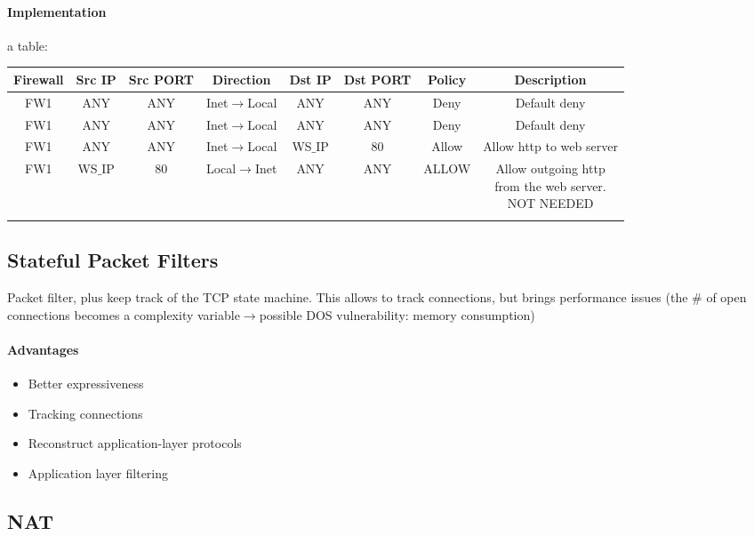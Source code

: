 \documentclass{article}
\begin{document}
\paragraph{Implementation} a table:\\
\begin{adjustwidth}{-3cm}{-3cm}
\begin{tabular}{|c|c|c|c|c|c|c|c|}
\hline
\textbf{Firewall}&\textbf{Src IP}&\textbf{Src PORT}&
\textbf{Direction}&\textbf{Dst IP}&
\textbf{Dst PORT}&\textbf{Policy}&
\textbf{Description}\\
\hline\hline
FW1		&ANY		&ANY		&Inet$\rightarrow$Local	&ANY		&ANY		&Deny	&Default deny\\
\hline
FW1		&ANY		&ANY		&Inet$\rightarrow$Local	&ANY		&ANY		&Deny	&Default deny\\
\hline
FW1		&ANY		&ANY		&Inet$\rightarrow$Local	&WS$\_$IP	&80		&Allow		&Allow http to web server\\
\hline
FW1		&WS$\_$IP	&80		&Local$\rightarrow$Inet	&ANY		&ANY		&ALLOW	&	\makecell{Allow outgoing http\\ from the web server.\\\color{red}NOT NEEDED}\\
\hline
&&&&&&&\\
\hline
\end{tabular}
\end{adjustwidth}

\subsection{Stateful Packet Filters}
Packet filter, plus keep track of the TCP state machine. This allows to track connections, but brings performance issues (the \# of open connections becomes a complexity variable$\rightarrow$possible DOS vulnerability: memory consumption)
\paragraph{Advantages}
\begin{itemize}
\item Better expressiveness
\item Tracking connections
\item Reconstruct application-layer protocols
\item Application layer filtering
\end{itemize}

\subsection{NAT}
\end{document}
